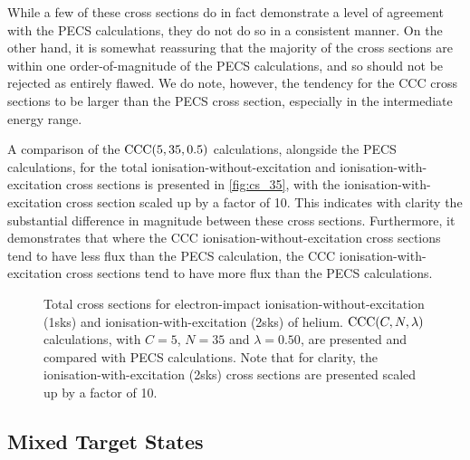 \documentclass[]{article}
\begin{document}
While a few of these cross sections do in fact demonstrate a level of agreement
with the PECS calculations, they do not do so in a consistent manner.
On the other hand, it is somewhat reassuring that the majority of the cross
sections are within one order-of-magnitude of the PECS calculations, and so
should not be rejected as entirely flawed.
We do note, however, the tendency for the CCC cross sections to be larger than
the PECS cross section, especially in the intermediate energy range.


A comparison of the $\mathrm{CCC}(5, 35, 0.5)$ calculations, alongside the
PECS calculations, for the total ionisation-without-excitation and
ionisation-with-excitation cross sections is presented in \autoref{fig:cs_35},
with the ionisation-with-excitation cross section scaled up by a factor of 10.
This indicates with clarity the substantial difference in magnitude between
these cross sections.
Furthermore, it demonstrates that where the CCC ionisation-without-excitation
cross sections tend to have less flux than the PECS calculation, the CCC
ionisation-with-excitation cross sections tend to have more flux than the PECS
calculations.

\begin{figure}[h]
  \begin{center}
    
  \end{center}
  \caption[TICS-with-excitation: $\mathrm{CCC}\lr{C, 35, 0.50}$]{
    Total cross sections for electron-impact ionisation-without-excitation
    (1sks) and ionisation-with-excitation (2sks) of helium.
    $\mathrm{CCC}(C, N, \lambda)$ calculations, with $C = 5$, $N = 35$ and
    $\lambda = 0.50$, are presented and compared with PECS
    \cite{PhysRevA.81.022716} calculations.
    Note that for clarity, the ionisation-with-excitation (2sks) cross sections
    are presented scaled up by a factor of 10.
  }
  \label{fig:cs_35}
\end{figure}

\clearpage

\subsection{Mixed Target States}
\label{sec:re-mixed}
\end{document}
